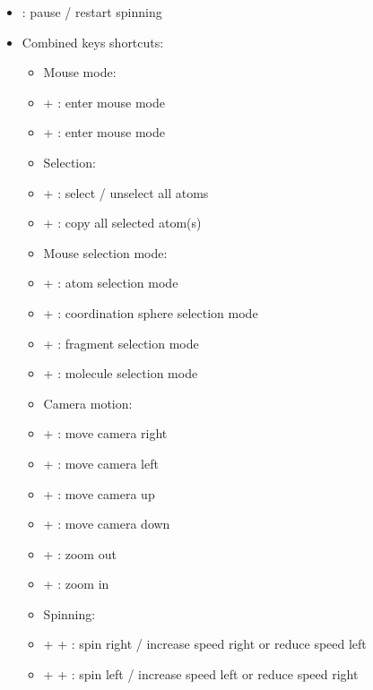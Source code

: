 {\begin{itemize}
\item[] \Spacebar : pause / restart spinning
\newpage
\item Combined keys shortcuts:
\begin{itemize}
\item Mouse mode:
\item[] \Alt +  : enter mouse  mode
\item[] \Alt +  : enter mouse  mode \\
\item Selection:
\item[] \Ctrl +  : select / unselect all atoms
\item[] \Ctrl +  : copy all selected atom(s)
\item Mouse selection mode:
\item[] \Shift + : atom selection mode
\item[] \Shift + : coordination sphere selection mode
\item[] \Shift + : fragment selection mode
\item[] \Shift + : molecule selection mode \\	
\item Camera motion:
\item[] \Ctrl + \RArrow : move camera right
\item[] \Ctrl + \LArrow : move camera left
\item[] \Ctrl + \UArrow : move camera up
\item[] \Ctrl + \DArrow : move camera down
\item[] \Shift + \UArrow : zoom out
\item[] \Shift + \DArrow : zoom in \\
\item Spinning: 
\item[] \Ctrl + \Shift + \RArrow : spin right / increase speed right or reduce speed left
\item[] \Ctrl + \Shift + \RArrow : spin left / increase speed left or reduce speed right

\end{itemize}
\end{itemize}}
